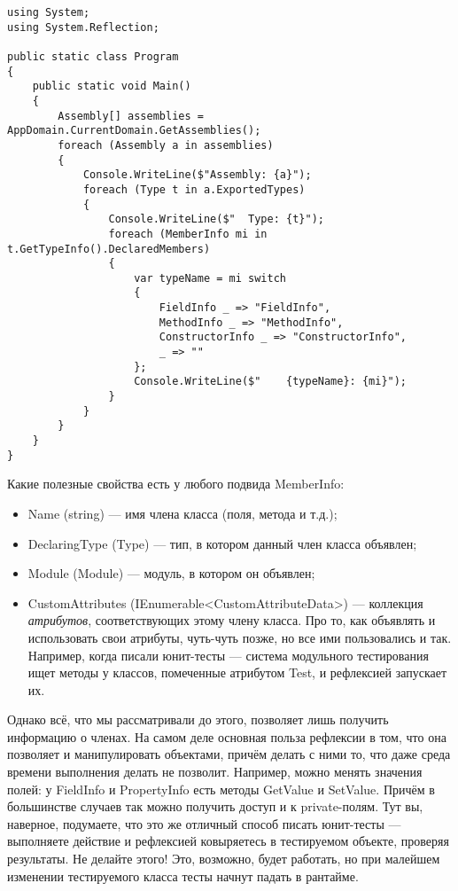 \documentclass[a5paper]{article}
\begin{document}
\begin{verbatim}
using System;
using System.Reflection;

public static class Program
{
    public static void Main()
    {
        Assembly[] assemblies = AppDomain.CurrentDomain.GetAssemblies();
        foreach (Assembly a in assemblies)
        {
            Console.WriteLine($"Assembly: {a}");
            foreach (Type t in a.ExportedTypes)
            {
                Console.WriteLine($"  Type: {t}");
                foreach (MemberInfo mi in t.GetTypeInfo().DeclaredMembers)
                {
                    var typeName = mi switch
                    {
                        FieldInfo _ => "FieldInfo",
                        MethodInfo _ => "MethodInfo",
                        ConstructorInfo _ => "ConstructorInfo",
                        _ => ""
                    };
                    Console.WriteLine($"    {typeName}: {mi}");
                }
            }
        }
    }
}
\end{verbatim}

Какие полезные свойства есть у любого подвида MemberInfo:

\begin{itemize}
    \item Name (string) --- имя члена класса (поля, метода и т.д.);
    \item DeclaringType (Type) --- тип, в котором данный член класса объявлен;
    \item Module (Module) --- модуль, в котором он объявлен;
    \item CustomAttributes (IEnumerable<CustomAttributeData>) --- коллекция \textit{атрибутов}, соответствующих этому члену класса. Про то, как объявлять и использовать свои атрибуты, чуть-чуть позже, но все ими пользовались и так. Например, когда писали юнит-тесты --- система модульного тестирования ищет методы у классов, помеченные атрибутом Test, и рефлексией запускает их.
\end{itemize}

Однако всё, что мы рассматривали до этого, позволяет лишь получить информацию о членах. На самом деле основная польза рефлексии в том, что она позволяет и манипулировать объектами, причём делать с ними то, что даже среда времени выполнения делать не позволит. Например, можно менять значения полей: у FieldInfo и PropertyInfo есть методы GetValue и SetValue. Причём в большинстве случаев так можно получить доступ и к private-полям. Тут вы, наверное, подумаете, что это же отличный способ писать юнит-тесты --- выполняете действие и рефлексией ковыряетесь в тестируемом объекте, проверяя результаты. Не делайте этого! Это, возможно, будет работать, но при малейшем изменении тестируемого класса тесты начнут падать в рантайме.
\end{document}
